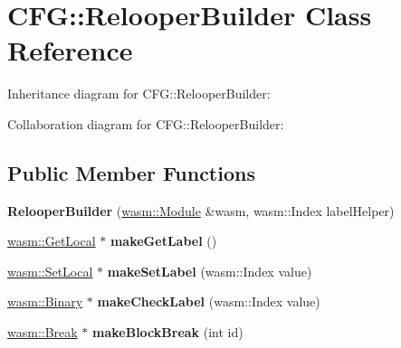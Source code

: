 \hypertarget{class_c_f_g_1_1_relooper_builder}{}\section{C\+FG\+:\+:Relooper\+Builder Class Reference}
\label{class_c_f_g_1_1_relooper_builder}


Inheritance diagram for C\+FG\+:\+:Relooper\+Builder\+:


Collaboration diagram for C\+FG\+:\+:Relooper\+Builder\+:
\subsection*{Public Member Functions}
\begin{DoxyCompactItemize}
\item 
\mbox{\label{class_c_f_g_1_1_relooper_builder_a130a7dd4a2d6eb5ea23e4395cb1dc582}} 
{\bfseries Relooper\+Builder} (\mbox{\hyperlink{classwasm_1_1_module}{wasm\+::\+Module}} \&wasm, wasm\+::\+Index label\+Helper)
\item 
\mbox{\label{class_c_f_g_1_1_relooper_builder_a65c88117088c644b9ae1ab6015b096e0}} 
\mbox{\hyperlink{classwasm_1_1_get_local}{wasm\+::\+Get\+Local}} $\ast$ {\bfseries make\+Get\+Label} ()
\item 
\mbox{\label{class_c_f_g_1_1_relooper_builder_a9615bdbe4c635ecd0fac821fb68580a6}} 
\mbox{\hyperlink{classwasm_1_1_set_local}{wasm\+::\+Set\+Local}} $\ast$ {\bfseries make\+Set\+Label} (wasm\+::\+Index value)
\item 
\mbox{\label{class_c_f_g_1_1_relooper_builder_af86b78e7bac333bd44f4e31ed45bd7c2}} 
\mbox{\hyperlink{classwasm_1_1_binary}{wasm\+::\+Binary}} $\ast$ {\bfseries make\+Check\+Label} (wasm\+::\+Index value)
\item 
\mbox{\label{class_c_f_g_1_1_relooper_builder_aea80029bb525e1c492b8026cc4ac2a19}} 
\mbox{\hyperlink{classwasm_1_1_break}{wasm\+::\+Break}} $\ast$ {\bfseries make\+Block\+Break} (int id)
\item 
\mbox{\label{class_c_f_g_1_1_relooper_builder_a17062a695325265ed0a812cb0578d3b5}} 

\end{DoxyCompactItemize}
